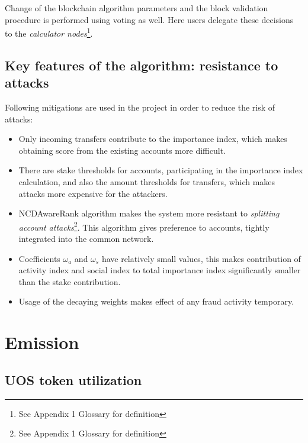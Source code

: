 \documentclass[a4paper,12pt]{article}
\begin{document}
Change of the blockchain algorithm parameters and the block validation procedure is performed using voting as well. Here users delegate these decisions to the \emph{calculator nodes}\footnote{See Appendix 1 Glossary for definition}.





\subsection{Key features of the algorithm: resistance to attacks}

Following mitigations are used in the project in order to reduce the risk of attacks:

\begin{itemize}
  \item Only incoming transfers contribute to the importance index, which makes obtaining score from the existing accounts more difficult.
  \item There are stake thresholds for accounts, participating in the importance index calculation, and also the amount thresholds for transfers, which makes attacks more expensive for the attackers.
  \item NCDAwareRank algorithm makes the system more resistant to \emph{splitting account attacks}\footnote{See Appendix 1 Glossary for definition}. This algorithm gives preference to accounts, tightly integrated into the common network.
  \item Coefficients $\omega_a$ and $\omega_s$ have relatively small values, this makes contribution of activity index and social index to total importance index significantly smaller than the stake contribution.
  \item Usage of the decaying weights makes effect of any fraud activity temporary. 
\end{itemize}


\section{Emission}

\subsection{U{\degree}OS token utilization}
\end{document}
